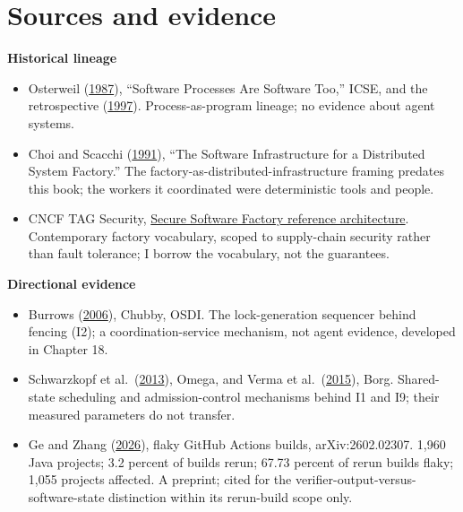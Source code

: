 \section*{Sources and evidence}

\textbf{Historical lineage}

\begin{itemize}
\tightlist
\item
  Osterweil (\href{https://dl.acm.org/doi/10.5555/41765.41766}{1987}), ``Software Processes Are Software Too,'' ICSE, and the retrospective (\href{https://dl.acm.org/doi/10.1145/253228.253440}{1997}). Process-as-program lineage; no evidence about agent systems.
\item
  Choi and Scacchi (\href{https://www.ics.uci.edu/~wscacchi/Software-Process/Readings/DistSysFactory.pdf}{1991}), ``The Software Infrastructure for a Distributed System Factory.'' The factory-as-distributed-infrastructure framing predates this book; the workers it coordinated were deterministic tools and people.
\item
  CNCF TAG Security, \href{https://tag-security.cncf.io/community/working-groups/supply-chain-security/secure-software-factory/secure-software-factory/}{Secure Software Factory reference architecture}. Contemporary factory vocabulary, scoped to supply-chain security rather than fault tolerance; I borrow the vocabulary, not the guarantees.
\end{itemize}

\textbf{Directional evidence}

\begin{itemize}
\tightlist
\item
  Burrows (\href{https://www.usenix.org/conference/osdi-06/chubby-lock-service-loosely-coupled-distributed-systems}{2006}), Chubby, OSDI. The lock-generation sequencer behind fencing (I2); a coordination-service mechanism, not agent evidence, developed in Chapter 18.
\item
  Schwarzkopf et al.~(\href{https://research.google/pubs/omega-flexible-scalable-schedulers-for-large-compute-clusters/}{2013}), Omega, and Verma et al.~(\href{https://research.google/pubs/large-scale-cluster-management-at-google-with-borg/}{2015}), Borg. Shared-state scheduling and admission-control mechanisms behind I1 and I9; their measured parameters do not transfer.
\item
  Ge and Zhang (\href{https://arxiv.org/abs/2602.02307}{2026}), flaky GitHub Actions builds, arXiv:2602.02307. 1,960 Java projects; 3.2 percent of builds rerun; 67.73 percent of rerun builds flaky; 1,055 projects affected. A preprint; cited for the verifier-output-versus-software-state distinction within its rerun-build scope only.
\end{itemize}

